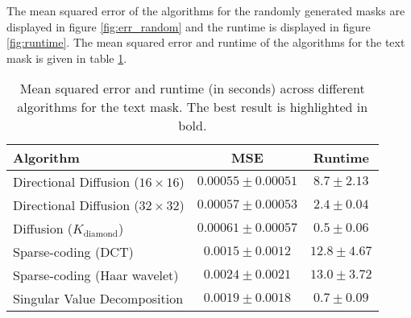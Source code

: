 The mean squared error of the algorithms for the randomly generated masks are displayed in figure \ref{fig:err_random} and the runtime is displayed in figure \ref{fig:runtime}. The mean squared error and runtime of the algorithms for the text mask is given in table \ref{tbl:err_text}.



\begin{table}
	\centering
	\begin{tabular}{|l|c|c|}
		\hline
		\textbf{Algorithm} & \textbf{MSE} & \textbf{Runtime} \\ \hline \hline
		Directional Diffusion ($16 \times 16$) & $\mathbf{0.00055} \pm 0.00051$ & $8.7 \pm 2.13$ \\ \hline
		Directional Diffusion ($32 \times 32$) & $0.00057 \pm 0.00053$ & $2.4 \pm 0.04$ \\ \hline
		Diffusion ($K_{\text{diamond}}$) & $0.00061 \pm 0.00057$ & $\mathbf{0.5} \pm 0.06$ \\ \hline
		Sparse-coding (DCT) & $0.0015 \pm 0.0012$ & $12.8 \pm 4.67$ \\ \hline
		Sparse-coding (Haar wavelet) & $0.0024 \pm 0.0021$ & $13.0 \pm 3.72$ \\ \hline
		Singular Value Decomposition & $0.0019 \pm 0.0018$ & $0.7 \pm 0.09$ \\ \hline
	\end{tabular}
	\caption{Mean squared error and runtime (in seconds) across different algorithms for the text mask. The best result is highlighted in bold.}
	\label{tbl:err_text}
\end{table}

